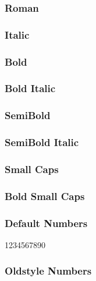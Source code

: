 \documentclass{article}
\begin{document}
\subsubsection*{Roman}
\lipsum[1]

\subsubsection*{Italic}
\textit{\lipsum[2]}

\subsubsection*{Bold}
\textbf{\lipsum[3]}

\subsubsection*{Bold Italic}

\textbf{\textit{\lipsum[4]}}

\subsubsection*{SemiBold}
{\crimsonsemibold \lipsum[3]}

\subsubsection*{SemiBold Italic}

{\crimsonsemibold \textit{\lipsum[4]}}

\subsubsection*{Small Caps}

\textsc{\lipsum[5]}


\subsubsection*{Bold Small Caps}

\textbf{\textsc{\lipsum[6]}}

\enlargethispage*{4ex}

\subsubsection*{Default Numbers}

1234567890

\subsubsection*{Oldstyle Numbers}

{}
\end{document}
